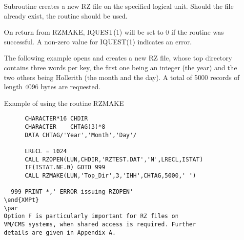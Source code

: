 \par 
Subroutine  creates a new RZ file on the specified
logical unit. Should the file already exist, the routine
 should be used.
\par
On return from RZMAKE, IQUEST(1) will be set to 0
if the routine was successful. A non-zero value for
IQUEST(1) indicates an error.
\par
The following example opens and creates a new RZ file,
whose top directory contains
three words per key, the first one being an integer (the year) and the
two others being Hollerith (the month and the day).
A total of 5000 records of length 4096 bytes are requested.
\begin{XMPt}{Example of using the routine RZMAKE}
\begin{verbatim}
      CHARACTER*16 CHDIR
      CHARACTER    CHTAG(3)*8
      DATA CHTAG/'Year','Month','Day'/
 
      LRECL = 1024
      CALL RZOPEN(LUN,CHDIR,'RZTEST.DAT','N',LRECL,ISTAT)
      IF(ISTAT.NE.0) GOTO 999
      CALL RZMAKE(LUN,'Top_Dir',3,'IHH',CHTAG,5000,' ')
 
  999 PRINT *,' ERROR issuing RZOPEN'
\end{XMPt}
\par
Option F is particularly important for RZ files on
VM/CMS systems, when shared access is required. Further
details are given in Appendix A.

\end{verbatim}
\end{XMPt}
